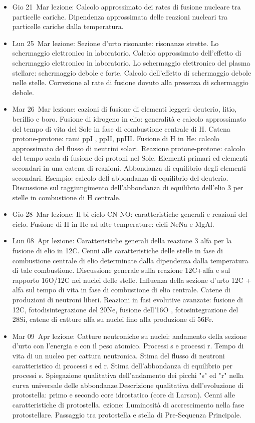 \begin{itemize}
\item Gio 21 Mar lezione: Calcolo approssimato dei rates di fusione nucleare tra particelle cariche. Dipendenza approssimata delle reazioni nucleari tra particelle cariche dalla temperatura. 
\item Lun 25 Mar lezione: Sezione d'urto risonante: risonanze strette. Lo schermaggio elettronico in laboratorio. Calcolo approssimato dell'effetto di schermaggio elettronico in laboratorio. Lo schermaggio elettronico del plasma stellare: schermaggio debole e forte. Calcolo dell'effetto di schermaggio debole nelle stelle. Correzione al rate di fusione dovuto alla presenza di schermaggio debole. 
\item Mar 26 Mar lezione: eazioni di fusione di elementi leggeri: deuterio, litio, berillio e boro. Fusione di idrogeno in elio: generalità e calcolo approssimato del tempo di vita del Sole in fase di combustione centrale di H. Catena protone-protone: rami ppI , ppII, ppIII. Fusione di H in He: calcolo approssimato del flusso di neutrini solari. Reazione protone-protone: calcolo del tempo scala di fusione dei protoni nel Sole. Elementi primari ed elementi secondari in una catena di reazioni. Abbondanza di equilibrio degli elementi secondari. Esempio: calcolo del\'l abbondanza di equilibrio del deuterio. Discussione sul raggiungimento dell'abbondanza di equilibrio dell'elio 3 per stelle in combustione di H centrale. 
\item Gio 28 Mar lezione: Il bi-ciclo CN-NO: caratteristiche generali e reazioni del ciclo. Fusione di H in He ad alte temperature: cicli NeNa e MgAl. 
\item Lun 08 Apr lezione: Caratteristiche generali della reazione 3 alfa per la fusione di elio in 12C. Cenni alle caratteristiche delle stelle in fase di combustione centrale di elio determinate dalla dipendenza dalla temperatura di tale combustione. Discussione generale sulla reazione 12C+alfa e sul rapporto 16O/12C nei nuclei delle stelle. Influenza della sezione d'urto 12C + alfa sul tempo di vita in fase di combustione di elio centrale. Catene di produzioni di neutroni liberi. Reazioni in fasi evolutive avanzate: fusione di 12C, fotodisintegrazione del 20Ne, fusione dell'16O , fotosintegrazione del 28Si, catene di catture alfa su nuclei fino alla produzione di 56Fe. 
\item Mar 09 Apr lezione: Catture neutroniche su nuclei: andamento della sezione d'urto con l'energia e con il peso atomico. Processi s e processi r. Tempo di vita di un nucleo per cattura neutronica. Stima del flusso di neutroni caratteristico di processi s ed r. Stima dell'abbondanza di equilibrio per processi s. Spiegazione qualitativa dell'andamento dei picchi "s" ed "r" nella curva universale delle abbondanze.Descrizione qualitativa dell'evoluzione di protostella: primo e secondo core idrostatico (core di Larson). Cenni alle caratteristiche di protostella. ezione: Luminosità di accrescimento nella fase protostellare. Passaggio tra protostella e stella di Pre-Sequenza Principale. 

\end{itemize}
